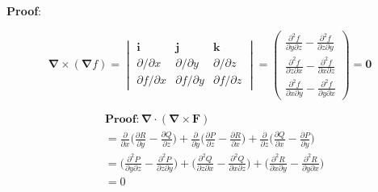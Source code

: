 \begin{paracol}{2}
\textbf{Proof}:

\vspace{-20pt}

$$
\mathbf{\nabla} \times (\mathbf{\nabla} f) = \begin{vmatrix}
    \mathbf{i} & \mathbf{j} & \mathbf{k} \\
    \partial / \partial x & \partial / \partial y & \partial / \partial z \\
    \partial f / \partial x & \partial f / \partial y & \partial f / \partial z
\end{vmatrix}
= \begin{pmatrix}
    \frac{\partial^2 f}{\partial y \partial z} - \frac{\partial^2 f}{\partial z \partial y} \\
    \frac{\partial^2 f}{\partial z \partial x} - \frac{\partial^2 f}{\partial x \partial z} \\
    \frac{\partial^2 f}{\partial x \partial y} - \frac{\partial^2 f}{\partial y \partial x}
\end{pmatrix}
= \mathbf{0}
$$


\vspace{-5pt}

\begin{align*}
    & \textbf{Proof}: \mathbf{\nabla} \cdot (\mathbf{\nabla} \times \mathbf{F}) \\
    & = \frac{\partial}{\partial x} \Bigg( \frac{\partial R}{\partial y} - \frac{\partial Q}{\partial z} \Bigg)
    + \frac{\partial}{\partial y} \Bigg( \frac{\partial P}{\partial z} - \frac{\partial R}{\partial x} \Bigg)
    + \frac{\partial}{\partial z} \Bigg( \frac{\partial Q}{\partial x} - \frac{\partial P}{\partial y} \Bigg) \\
    & = \Bigg( \frac{\partial^2 P}{\partial y \partial z} - \frac{\partial^2 P}{\partial z \partial y} \Bigg)
    + \Bigg( \frac{\partial^2 Q}{\partial z \partial x} - \frac{\partial^2 Q}{\partial x \partial z} \Bigg)
    + \Bigg( \frac{\partial^2 R}{\partial x \partial y} - \frac{\partial^2 R}{\partial y \partial x} \Bigg) \\
    & = 0
\end{align*}


\end{paracol}
